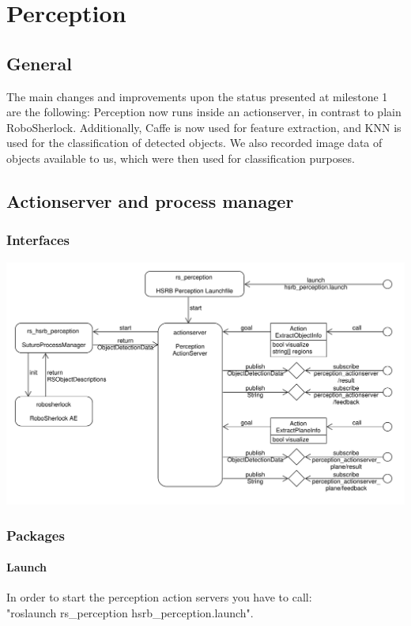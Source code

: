 \documentclass[main.tex]{subfiles}
\begin{document}
	
	\chapter{Perception}
		
		\section{General}
		The main changes and improvements upon the status presented at milestone 1 are the following: Perception now runs inside an actionserver, in contrast to 			plain RoboSherlock. Additionally, Caffe is now used for feature extraction, and KNN is used for the classification of detected objects. 
		We also recorded image data of objects available to us, which were then used for classification purposes.
		
		\section{Actionserver and process manager}
			\subsection{Interfaces}
			\includegraphics[width=\textwidth]{../architecture/perception_architecture/perception.pdf}
			
			\subsection{Packages}
			\subsubsection{Launch}
			In order to start the perception action servers you have to call:\\
			"roslaunch rs\_perception hsrb\_perception.launch".
\end{document}
